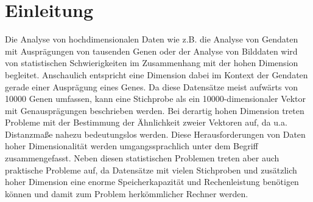 \chapter{Einleitung}
\label{ch:Enleitung}

Die Analyse von hochdimensionalen Daten wie z.B. die Analyse von Gendaten mit Ausprägungen von
tausenden Genen \parencite[siehe z.B.][]{Parmigiani.2003} oder der Analyse von Bilddaten wird von statistischen
Schwierigkeiten im Zusammenhang mit der hohen Dimension begleitet. Anschaulich entspricht eine
Dimension dabei im Kontext der Gendaten gerade einer Ausprägung eines Genes. Da diese Datensätze
meist aufwärts von \num{10000} Genen umfassen, kann eine Stichprobe als ein
\num{10000}-dimensionaler Vektor mit Genausprägungen beschrieben werden. Bei derartig hohen
Dimension treten Probleme mit der Bestimmung der Ähnlichkeit zweier Vektoren auf, da u.a.
Distanzmaße nahezu bedeutungslos werden. Diese Herausforderungen von Daten hoher Dimensionalität
werden umgangssprachlich unter dem Begriff  \parencite{Bellman.1957} zusammengefasst. Neben diesen statistischen Problemen treten aber auch
praktische Probleme auf, da Datensätze mit vielen Stichproben und zusätzlich hoher Dimension eine
enorme Speicherkapazität und Rechenleistung benötigen können und damit zum Problem herkömmlicher
Rechner werden.

